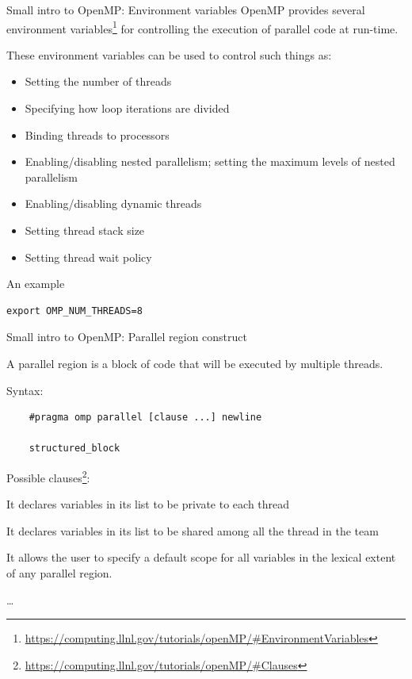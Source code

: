 \documentclass[10pt,xcolor=table]{beamer}
\begin{document}
\begin{frame}[fragile]{Small intro to OpenMP: Environment variables}
OpenMP provides several environment variables\footnote{\url{https://computing.llnl.gov/tutorials/openMP/\#EnvironmentVariables}} for controlling the execution of parallel code at run-time.

These environment variables can be used to control such things as:
\begin{itemize}
    \tiny
    \item Setting the number of threads
    \item Specifying how loop iterations are divided
    \item Binding threads to processors
    \item Enabling/disabling nested parallelism; setting the maximum levels of nested parallelism
    \item Enabling/disabling dynamic threads
    \item Setting thread stack size
    \item Setting thread wait policy
\end{itemize}

An example

\begin{verbatim}
export OMP_NUM_THREADS=8
\end{verbatim}
    
\end{frame}

\begin{frame}[fragile]{Small intro to OpenMP: Parallel region construct}

A parallel region is a block of code that will be executed by multiple threads.

Syntax:

\begin{verbatim}
    #pragma omp parallel [clause ...] newline
    
    structured_block
\end{verbatim}
Possible clauses\footnote{\url{https://computing.llnl.gov/tutorials/openMP/\#Clauses}}:
    \begin{description}
    \footnotesize
    \item[private (list)] It declares variables in its list to be private to each thread
    \item[shared (list)] It declares variables in its list to be shared among all the thread in the team
    \item[default (shared|none)]It allows the user to specify a default scope for all variables in the lexical extent of any parallel region.
    \item[] \ldots
    \end{description}

\end{frame}
\end{document}
